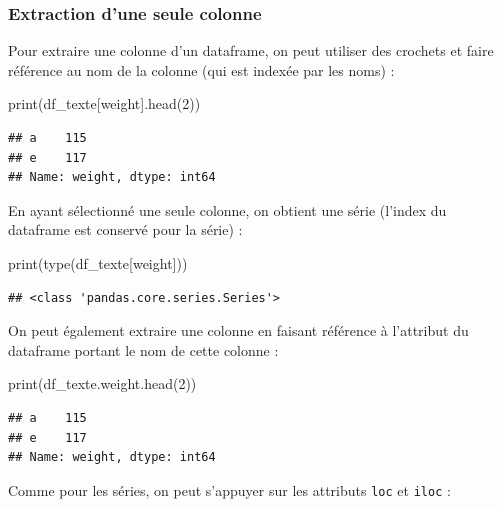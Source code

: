 \documentclass[
  12pt,
]{book}
\newenvironment{Shaded}{\begin{snugshade}}{\end{snugshade}}
\newcommand{\BuiltInTok}[1]{#1}
\newcommand{\DecValTok}[1]{\textcolor[rgb]{0.00,0.00,0.81}{#1}}
\newcommand{\NormalTok}[1]{#1}
\newcommand{\StringTok}[1]{\textcolor[rgb]{0.31,0.60,0.02}{#1}}
\numberwithin{equation}{section}
\numberwithin{countremarque}{section}
\begin{document}
\subsubsection{Extraction d'une seule colonne}\label{extraction-dune-seule-colonne}

Pour extraire une colonne d'un dataframe, on peut utiliser des crochets et faire référence au nom de la colonne (qui est indexée par les noms) :

\begin{Shaded}
\begin{Highlighting}[]
\BuiltInTok{print}\NormalTok{(df\_texte[}\StringTok{\textquotesingle{}weight\textquotesingle{}}\NormalTok{].head(}\DecValTok{2}\NormalTok{))}
\end{Highlighting}
\end{Shaded}

\begin{lstlisting}
## a    115
## e    117
## Name: weight, dtype: int64
\end{lstlisting}

En ayant sélectionné une seule colonne, on obtient une série (l'index du dataframe est conservé pour la série) :

\begin{Shaded}
\begin{Highlighting}[]
\BuiltInTok{print}\NormalTok{(}\BuiltInTok{type}\NormalTok{(df\_texte[}\StringTok{\textquotesingle{}weight\textquotesingle{}}\NormalTok{]))}
\end{Highlighting}
\end{Shaded}

\begin{lstlisting}
## <class 'pandas.core.series.Series'>
\end{lstlisting}

On peut également extraire une colonne en faisant référence à l'attribut du dataframe portant le nom de cette colonne :

\begin{Shaded}
\begin{Highlighting}[]
\BuiltInTok{print}\NormalTok{(df\_texte.weight.head(}\DecValTok{2}\NormalTok{))}
\end{Highlighting}
\end{Shaded}

\begin{lstlisting}
## a    115
## e    117
## Name: weight, dtype: int64
\end{lstlisting}

Comme pour les séries, on peut s'appuyer sur les attributs \texttt{loc} et \texttt{iloc} :
\end{document}
